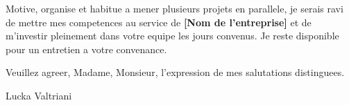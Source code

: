 \documentclass[11pt,a4paper]{article}
\newcommand{\entreprise}{[Nom de l'entreprise]}
\begin{document}
Motive, organise et habitue a mener plusieurs projets en parallele, je serais ravi de mettre mes competences au service de \textbf{\entreprise} et de m'investir pleinement dans votre equipe les jours convenus. Je reste disponible pour un entretien a votre convenance.

\vspace{18pt}

Veuillez agreer, Madame, Monsieur, l'expression de mes salutations distinguees.

\vspace{28pt}

\noindent Lucka Valtriani
\end{document}
